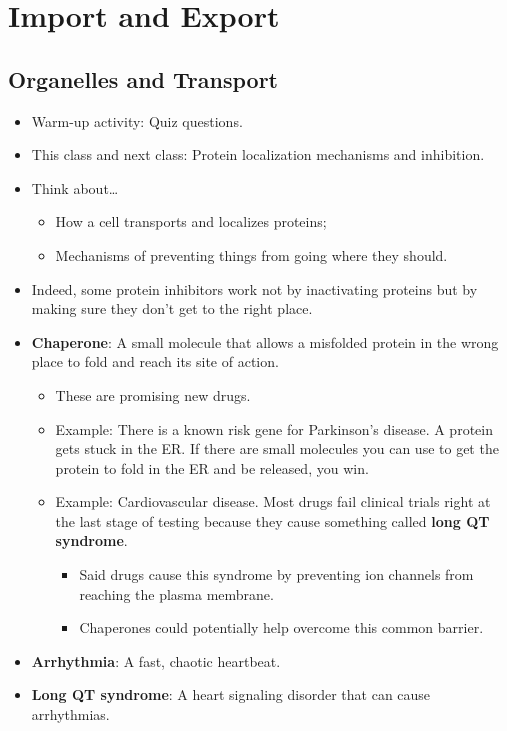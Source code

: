 \documentclass[../notes.tex]{subfiles}
\begin{document}
\chapter{Import and Export}
\section{Organelles and Transport}
\begin{itemize}
    \item {}Warm-up activity: Quiz questions.
    \item This class and next class: Protein localization mechanisms and inhibition.
    \item Think about\dots
    \begin{itemize}
        \item How a cell transports and localizes proteins;
        \item Mechanisms of preventing things from going where they should.
    \end{itemize}
    \item Indeed, some protein inhibitors work not by inactivating proteins but by making sure they don't get to the right place.
    \item \textbf{Chaperone}: A small molecule that allows a misfolded protein in the wrong place to fold and reach its site of action.
    \begin{itemize}
        \item These are promising new drugs.
        \item Example: There is a known risk gene for Parkinson's disease. A protein gets stuck in the ER. If there are small molecules you can use to get the protein to fold in the ER and be released, you win.
        \item Example: Cardiovascular disease. Most drugs fail clinical trials right at the last stage of testing because they cause something called \textbf{long QT syndrome}.
        \begin{itemize}
            \item Said drugs cause this syndrome by preventing ion channels from reaching the plasma membrane.
            \item Chaperones could potentially help overcome this common barrier.
        \end{itemize}
    \end{itemize}
    \item \textbf{Arrhythmia}: A fast, chaotic heartbeat.
    \item \textbf{Long QT syndrome}: A heart signaling disorder that can cause arrhythmias.

\end{itemize}
\end{document}
